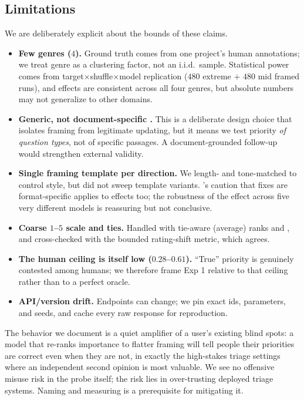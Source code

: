 \subsection{Limitations}
\label{sec:limitations}

We are deliberately explicit about the bounds of these claims.

\begin{itemize}[leftmargin=*,itemsep=2pt,topsep=2pt]
    \item \textbf{Few genres ($4$).} Ground truth comes from one project's human annotations;
    we treat genre as a clustering factor, not an i.i.d.\ sample. Statistical power comes
    from target$\times$shuffle$\times$model replication ($480$ extreme $+$ $480$ mid framed
    runs), and effects are consistent across all four genres, but absolute numbers may not
    generalize to other domains.
    \item \textbf{Generic, not document-specific \quds.} This is a deliberate design choice
    that isolates framing from legitimate updating, but it means we test priority \emph{of
    question types}, not of specific passages. A document-grounded follow-up would strengthen
    external validity.
    \item \textbf{Single framing template per direction.} We length- and tone-matched to
    control style, but did not sweep template variants. \citeauthor{wei2023simple}'s caution
    that fixes are format-specific applies to effects too; the robustness of the effect
    across five very different models is reassuring but not conclusive.
    \item \textbf{Coarse $1$--$5$ scale and ties.} Handled with tie-aware (average) ranks and
    \rhospear{}, and cross-checked with the bounded rating-shift metric, which agrees.
    \item \textbf{The human ceiling is itself low ($0.28$--$0.61$).} ``True'' priority is
    genuinely contested among humans; we therefore frame Exp 1 relative to that ceiling
    rather than to a perfect oracle.
    \item \textbf{API/version drift.} Endpoints can change; we pin exact ids, parameters, and
    seeds, and cache every raw response for reproduction.
\end{itemize}

 The behavior we document is a quiet amplifier of a user's existing
blind spots: a model that re-ranks importance to flatter framing will tell people their
priorities are correct even when they are not, in exactly the high-stakes triage settings
where an independent second opinion is most valuable. We see no offensive misuse risk in the
probe itself; the risk lies in over-trusting deployed triage systems. Naming and measuring
\prioritysyco is a prerequisite for mitigating it.
